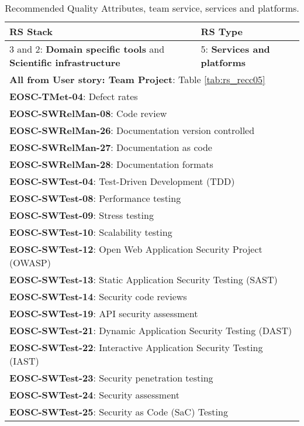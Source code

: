 \begin{center}
\begin{table}

  \small
  \begin{tabular}{|p{0.65\linewidth}|p{0.35\linewidth}|} \hline

    \textbf{RS Stack} & \textbf{RS Type} \\ \hline  \hline
    3 and 2: \textbf{Domain specific tools} and \textbf{Scientific infrastructure} &
    5: \textbf{Services and platforms} \\ \hline \hline
    \multicolumn{2}{|l|}{\textbf{All from User story: Team Project}: Table \ref{tab:rs_recc05}} \\ \hline
    \multicolumn{2}{|l|}{\textbf{EOSC-TMet-04}: Defect rates} \\ \hline
    \multicolumn{2}{|l|}{\textbf{EOSC-SWRelMan-08}: Code review} \\ \hline
    \multicolumn{2}{|l|}{\textbf{EOSC-SWRelMan-26}: Documentation version controlled} \\ \hline
    \multicolumn{2}{|l|}{\textbf{EOSC-SWRelMan-27}: Documentation as code} \\ \hline
    \multicolumn{2}{|l|}{\textbf{EOSC-SWRelMan-28}: Documentation formats} \\ \hline
    \multicolumn{2}{|l|}{\textbf{EOSC-SWTest-04}: Test-Driven Development (TDD)} \\ \hline
    \multicolumn{2}{|l|}{\textbf{EOSC-SWTest-08}: Performance testing} \\ \hline
    \multicolumn{2}{|l|}{\textbf{EOSC-SWTest-09}: Stress testing} \\ \hline
    \multicolumn{2}{|l|}{\textbf{EOSC-SWTest-10}: Scalability testing} \\ \hline
    \multicolumn{2}{|l|}{\textbf{EOSC-SWTest-12}: Open Web Application Security Project (OWASP)} \\ \hline
    \multicolumn{2}{|l|}{\textbf{EOSC-SWTest-13}: Static Application Security Testing (SAST)} \\ \hline
    \multicolumn{2}{|l|}{\textbf{EOSC-SWTest-14}: Security code reviews} \\ \hline
    \multicolumn{2}{|l|}{\textbf{EOSC-SWTest-19}: API security assessment} \\ \hline
    \multicolumn{2}{|l|}{\textbf{EOSC-SWTest-21}: Dynamic Application Security Testing (DAST)} \\ \hline
    \multicolumn{2}{|l|}{\textbf{EOSC-SWTest-22}: Interactive Application Security Testing (IAST)} \\ \hline
    \multicolumn{2}{|l|}{\textbf{EOSC-SWTest-23}: Security penetration testing} \\ \hline
    \multicolumn{2}{|l|}{\textbf{EOSC-SWTest-24}: Security assessment} \\ \hline
    \multicolumn{2}{|l|}{\textbf{EOSC-SWTest-25}: Security as Code (SaC) Testing} \\ \hline

  \end{tabular}
  \caption{Recommended Quality Attributes, team service, services and platforms.}
  \label{tab:rs_recc08}
\end{table}
\end{center}


